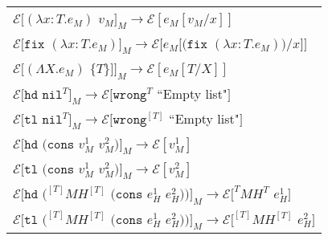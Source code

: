 \begin{figure}[p]
\centering
\begin{tabular}{l}
\vspace{5pt}

$\mathscr{E}[(\lambda x:T.e_{M})$ $v_{M}]_{M}\rightarrow\mathscr{E}[e_{M}[v_{M}/x]]$ \\

\vspace{5pt}

$\mathscr{E}[\mathtt{fix}$ $(\lambda x:T.e_{M})]_{M}\rightarrow\mathscr{E}[e_{M}[(\mathtt{fix}$ $(\lambda x:T.e_{M}))/x]]$ \\

\vspace{5pt}

$\mathscr{E}[(\Lambda X.e_{M})$ $\lbrace T\rbrace]]_{M}\rightarrow\mathscr{E}[e_{M}[T/X]]$ \\

\vspace{5pt}

$\mathscr{E}[\mathtt{hd}$ $\mathtt{nil}^{T}]_{M}\rightarrow\mathscr{E}[\mathtt{wrong}^{T}$ ``Empty list"$]$ \\

\vspace{5pt}

$\mathscr{E}[\mathtt{tl}$ $\mathtt{nil}^{T}]_{M}\rightarrow\mathscr{E}[\mathtt{wrong}^{[T]}$ ``Empty list"$]$ \\

\vspace{5pt}

$\mathscr{E}[\mathtt{hd}$ $(\mathtt{cons}$ $v_{M}^{1}$ $v_{M}^{2})]_{M}\rightarrow\mathscr{E}[v_{M}^{1}]$ \\

\vspace{5pt}

$\mathscr{E}[\mathtt{tl}$ $(\mathtt{cons}$ $v_{M}^{1}$ $v_{M}^{2})]_{M}\rightarrow\mathscr{E}[v_{M}^{2}]$ \\

\vspace{5pt}

$\mathscr{E}[\mathtt{hd}$ $(^{[T]}MH^{[T]}$ $(\mathtt{cons}$ $e_{H}^{1}$ $e_{H}^{2}))]_{M}\rightarrow\mathscr{E}[^{T}MH^{T}$ $e_{H}^{1}]$ \\

\vspace{5pt}

$\mathscr{E}[\mathtt{tl}$ $(^{[T]}MH^{[T]}$ $(\mathtt{cons}$ $e_{H}^{1}$ $e_{H}^{2}))]_{M}\rightarrow\mathscr{E}[^{[T]}MH^{[T]}$ $e_{H}^{2}]$ \\


\end{tabular}
\end{figure}
